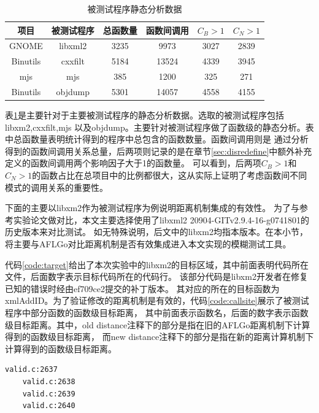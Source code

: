 \documentclass[bachelor]{njupthesis}
\begin{document}
\begin{table}[hbp]
	\centering
	\begin{tabular}{|c|c|c|c|c|c|}
	  \hline
	  项目 & 被测试程序 & 总函数量  &函数间调用 &$C_B >1$ & $C_N >1$ \\
	  \hline
	  GNOME & libxml2 & 3235 &9973  & 3027 &  2839\\
	  \hline
	  Binutils & cxxfilt & 5184 & 13524  & 4339 & 3945\\
	  \hline
	  mjs & mjs & 385 & 1200  &  325 & 271\\
	  \hline
	  Binutils & objdump & 5301 & 14057 &  4558 &  4155\\
	  \hline  
	\end{tabular}
	\caption{被测试程序静态分析数据}\label{tab:sa}
  \end{table}
表\ref{tab:sa}是主要针对于主要被测试程序的静态分析数据。选取的被测试程序包括libxm2\cite{Libxml2},cxxfilt\cite{cxxfilt},mjs\cite{mjs}
以及objdump\cite{objdump}。主要针对被测试程序做了函数级的静态分析。表中总函数量表明统计得到的程序中总包含的函数数量。函数间调用则是
通过分析得到的函数间调用关系总量，后两项则记录的是在章节\ref{sec:disredefine}中额外补充定义的函数间调用两个影响因子大于1的函数量。
可以看到，后两项$C_B >1$和 $C_N >1$的函数占比在总项目中的比例都很大，这从实际上证明了考虑函数间不同模式的调用关系的重要性。

下面的主要以libxm2作为被测试程序为例说明距离机制集成的有效性。
为了与参考实验论文做对比，本文主要选择使用了libxml2 20904-GITv2.9.4-16-g0741801的历史版本来对比测试。
如无特殊说明，后文中的libxm2均指本版本。在本小节，将主要与AFLGo对比距离机制是否有效集成进入本文实现的模糊测试工具。

代码\ref{code:target}给出了本次实验中的libxm2的目标区域，其中前面表明代码所在文件，后面数字表示目标代码所在的代码行。
该部分代码是libxm2开发者在修复已知的错误时经由ef709ce2提交的补丁版本。
其对应的所在的目标函数为xmlAddID。为了验证修改的距离机制是有效的，代码\ref{code:callsite}展示了被测试程序中部分函数的函数级目标距离，
其中前面表示函数名，后面的数字表示函数级目标距离。其中，old distance注释下的部分是指在旧的AFLGo距离机制下计算得到的函数级目标距离，
而new distance注释下的部分是指在新的距离计算机制下计算得到的函数级目标距离。

\renewcommand{\thelstlisting}{5.\arabic{lstlisting}}
\begin{lstlisting}[caption={指定目标代码区域行号},label={code:target}]
	valid.c:2637
	valid.c:2638
	valid.c:2639
	valid.c:2640
\end{lstlisting}
\end{document}
